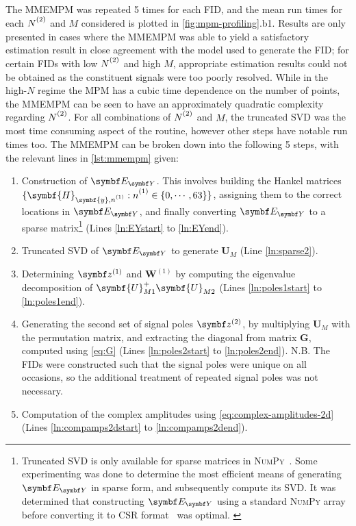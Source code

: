 The \ac{MMEMPM} was repeated 5 times for each \ac{FID}, and the mean run
times for each $\Ntwo$ and $M$ considered is plotted in
\cref{fig:mpm-profiling}.b1.
Results are only presented in cases where the \ac{MMEMPM} was able to yield a
satisfactory estimation result in close agreement with the model used to
generate the \ac{FID}; for certain \acp{FID} with low
$\Ntwo$ and high $M$, appropriate estimation results could not be obtained as
the constituent signals were too poorly resolved.
While in the high-$N$ regime the \ac{MPM} has a cubic time dependence
on the number of points, the \ac{MMEMPM} can be seen to have an approximately
quadratic complexity regarding $\Ntwo$.
For all combinations of $\Ntwo$ and $M$,
the truncated \ac{SVD} was the most time consuming aspect of the routine,
however other steps have notable run times too. The \ac{MMEMPM} can be broken
down into the following 5 steps, with the relevant lines in \cref{lst:mmempm}
given:
\begin{enumerate}
    \item Construction of $\EY$. This involves building the Hankel matrices
        $\lbrace \symbf{H}_{\symbf{y},\none} : \none \in \lbrace 0, \cdots, 63
        \rbrace \rbrace$, assigning them to the
        correct locations in $\EY$, and finally converting  $\EY$ to a sparse
        matrix\footnote{
            Truncated \ac{SVD} is only available for sparse matrices in
            \textsc{NumPy}~\cite{svds}. Some experimenting was done to determine
            the most efficient means of generating $\EY$ in sparse form, and
            subsequently compute its \ac{SVD}.
            It was determined that constructing $\EY$ using a
            standard \textsc{NumPy} array before converting it to
            \ac{CSR} format~\cite{csr} was optimal.
            \label{fn:sparse-svd}
        } (Lines \ref{ln:EYstart} to \ref{ln:EYend}).
    \item Truncated \ac{SVD} of $\EY$ to generate $\symbf{U}_M$ (Line \ref{ln:sparse2}).
    \item Determining $\bdzone$ and  $\symbf{W}^{(1)}$ by computing the
        eigenvalue decomposition of $\symbf{U}_{M1}^+ \symbf{U}_{M2}^{\vphantom{+}}$ (Lines
        \ref{ln:poles1start} to \ref{ln:poles1end}).
    \item Generating the second set of signal poles $\bdztwo$, by
        multiplying $\symbf{U}_M$ with the permutation matrix, and extracting
        the diagonal from matrix $\symbf{G}$, computed using \cref{eq:G} (Lines
        \ref{ln:poles2start} to \ref{ln:poles2end}). N.B. The \acp{FID} were
        constructed such that the signal poles were unique on all occasions, so
        the additional treatment of repeated signal poles was not necessary.
    \item Computation of the complex amplitudes using
        \cref{eq:complex-amplitudes-2d} (Lines \ref{ln:compamps2dstart} to
        \ref{ln:compamps2dend}).
\end{enumerate}
